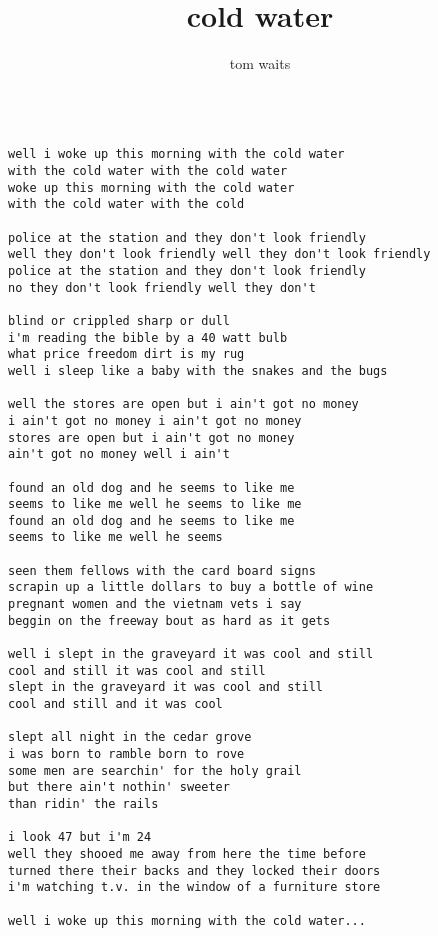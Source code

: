 \author{tom waits}
\title{cold water}
\maketitle
\begin{verbatim}

well i woke up this morning with the cold water
with the cold water with the cold water
woke up this morning with the cold water
with the cold water with the cold

police at the station and they don't look friendly
well they don't look friendly well they don't look friendly
police at the station and they don't look friendly
no they don't look friendly well they don't

blind or crippled sharp or dull
i'm reading the bible by a 40 watt bulb
what price freedom dirt is my rug
well i sleep like a baby with the snakes and the bugs

well the stores are open but i ain't got no money
i ain't got no money i ain't got no money
stores are open but i ain't got no money
ain't got no money well i ain't

found an old dog and he seems to like me
seems to like me well he seems to like me
found an old dog and he seems to like me
seems to like me well he seems

seen them fellows with the card board signs
scrapin up a little dollars to buy a bottle of wine
pregnant women and the vietnam vets i say
beggin on the freeway bout as hard as it gets

well i slept in the graveyard it was cool and still
cool and still it was cool and still
slept in the graveyard it was cool and still
cool and still and it was cool

slept all night in the cedar grove
i was born to ramble born to rove
some men are searchin' for the holy grail
but there ain't nothin' sweeter
than ridin' the rails

i look 47 but i'm 24
well they shooed me away from here the time before
turned there their backs and they locked their doors
i'm watching t.v. in the window of a furniture store

well i woke up this morning with the cold water...
\end{verbatim}